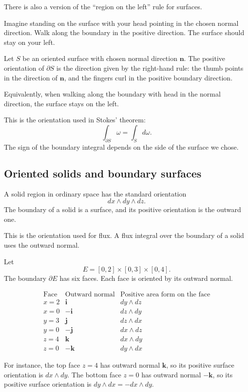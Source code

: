 There is also a version of the ``region on the left'' rule for surfaces.

Imagine standing on the surface with your head pointing in the chosen normal direction.
Walk along the boundary in the positive direction.  The surface should stay on your
left.

\begin{definition}
Let \(S\) be an oriented surface with chosen normal direction \(\mathbf n\).  The positive
orientation of \(\partial S\) is the direction given by the right-hand rule: the thumb
points in the direction of \(\mathbf n\), and the fingers curl in the positive boundary
direction.

Equivalently, when walking along the boundary with head in the normal direction, the
surface stays on the left.
\end{definition}

This is the orientation used in Stokes' theorem:
\[
    \int_{\partial S}\omega=\int_S d\omega.
\]
The sign of the boundary integral depends on the side of the surface we chose.

\subsection{Oriented solids and boundary surfaces}

A solid region in ordinary space has the standard orientation
\[
    dx\wedge dy\wedge dz.
\]
The boundary of a solid is a surface, and its positive orientation is the outward one.

This is the orientation used for flux.  A flux integral over the boundary of a solid uses
the outward normal.

\begin{example}
Let
\[
    E=[0,2]\times[0,3]\times[0,4].
\]
The boundary \(\partial E\) has six faces.  Each face is oriented by its outward normal.

\[
\begin{array}{c|c|c}
\text{Face} & \text{Outward normal} & \text{Positive area form on the face} \\ \hline
x=2 & \mathbf i & dy\wedge dz\\[1mm]
x=0 & -\mathbf i & dz\wedge dy\\[1mm]
y=3 & \mathbf j & dz\wedge dx\\[1mm]
y=0 & -\mathbf j & dx\wedge dz\\[1mm]
z=4 & \mathbf k & dx\wedge dy\\[1mm]
z=0 & -\mathbf k & dy\wedge dx
\end{array}
\]

For instance, the top face \(z=4\) has outward normal \(\mathbf k\), so its positive
surface orientation is \(dx\wedge dy\).  The bottom face \(z=0\) has outward normal
\(-\mathbf k\), so its positive surface orientation is \(dy\wedge dx=-dx\wedge dy\).
\end{example}

